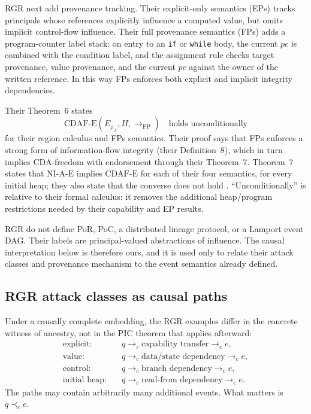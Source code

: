\documentclass[10pt,twocolumn]{article}
\newcommand{\FP}{\mathrm{FP}}
\newcommand{\CDAF}{\mathrm{CDAF\text{-}E}}
\newcommand{\hb}{\prec_{c}}
\begin{document}
RGR next add provenance tracking.  Their explicit-only semantics (EPs) tracks
principals whose references explicitly influence a computed value, but omits
implicit control-flow influence.  Their full provenance semantics (FPs) adds a
program-counter label stack: on entry to an \texttt{if} or \texttt{while}
body, the current $pc$ is combined with the condition label, and the assignment
rule checks target provenance, value provenance, and the current $pc$ against
the owner of the written reference.  In this way FPs enforces both explicit and
implicit integrity dependencies.

Their Theorem~6 states
\begin{equation}
  \CDAF(E_{\rho_A},H,\to_{\FP})
  \quad\text{holds unconditionally}
  \label{eq:rgr-thm6}
\end{equation}
for their region calculus and FPs semantics.  Their proof says that FPs enforces
a strong form of information-flow integrity (their Definition~8), which in turn
implies CDA-freedom with endorsement through their Theorem~7.  Theorem~7 states
that $\mathrm{NI\text{-}A\text{-}E}$ implies $\mathrm{CDAF\text{-}E}$ for each
of their four semantics, for every initial heap; they also state that the
converse does not hold \cite{rajani_garg_rezk2016}.  ``Unconditionally'' is
relative to their formal calculus: it removes the additional heap/program
restrictions needed by their capability and EP results.

RGR do not define PoR, PoC, a distributed lineage protocol, or a Lamport event
DAG.  Their labels are principal-valued abstractions of influence.  The causal
interpretation below is therefore ours, and it is used only to relate their
attack classes and provenance mechanism to the event semantics already defined.

\subsection{RGR attack classes as causal paths}

Under a causally complete embedding, the RGR examples differ in the concrete
witness of ancestry, not in the PIC theorem that applies afterward:
\begin{align}
  \text{explicit:}\quad
  &q\to_c \text{capability transfer}\to_c e,\\
  \text{value:}\quad
  &q\to_c \text{data/state dependency}\to_c e,\\
  \text{control:}\quad
  &q\to_c \text{branch dependency}\to_c e,\\
  \text{initial heap:}\quad
  &q\to_c \text{read-from dependency}\to_c e.
\end{align}
The paths may contain arbitrarily many additional events.  What matters is
$q\hb e$.
\end{document}
